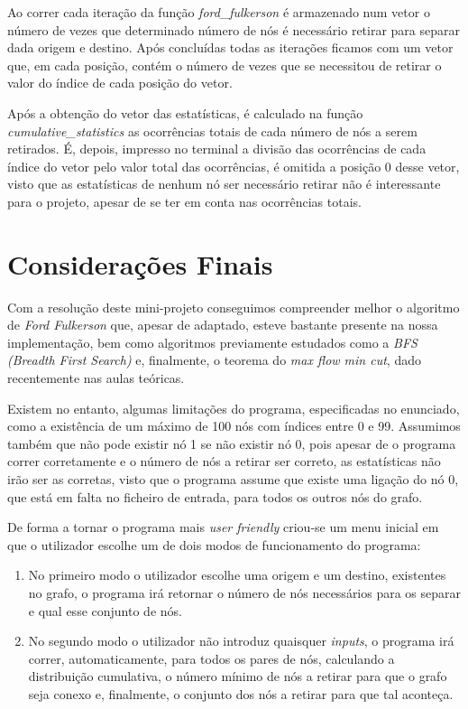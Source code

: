 \documentclass[a4paper]{article}
\begin{document}
Ao correr cada iteração da função \textit{ford\_fulkerson} é armazenado num vetor o número de vezes que determinado número de nós é necessário retirar para separar dada origem e destino. Após concluídas todas as iterações ficamos com um vetor que, em cada posição, contém o número de vezes que se necessitou de retirar o valor do índice de cada posição do vetor. %

Após a obtenção do vetor das estatísticas, é calculado na função \textit{cumulative\_statistics} as ocorrências totais de cada número de nós a serem retirados. É, depois, impresso no terminal a divisão das ocorrências de cada índice do vetor pelo valor total das ocorrências, é omitida a posição 0 desse vetor, visto que as estatísticas de nenhum nó ser necessário retirar não é interessante para o projeto, apesar de se ter em conta nas ocorrências totais.

\section{Considerações Finais}
Com a resolução deste mini-projeto conseguimos compreender melhor o algoritmo de \textit{Ford Fulkerson} que, apesar de adaptado, esteve bastante presente na nossa implementação, bem como algoritmos previamente estudados como a \textit{BFS (Breadth First Search)} e, finalmente, o teorema do \textit{max flow min cut}, dado recentemente nas aulas teóricas.

Existem no entanto, algumas limitações do programa, especificadas no enunciado, como a existência de um máximo de 100 nós com índices entre 0 e 99. Assumimos também que não pode existir nó 1 se não existir nó 0, pois apesar de o programa correr corretamente e o número de nós a retirar ser correto, as estatísticas não irão ser as corretas, visto que o programa assume que existe uma ligação do nó 0, que está em falta no ficheiro de entrada, para todos os outros nós do grafo.

De forma a tornar o programa mais \textit{user friendly} criou-se um menu inicial em que o utilizador escolhe um de dois modos de funcionamento do programa:

\begin{enumerate}
	\item No primeiro modo o utilizador escolhe uma origem e um destino, existentes no grafo, o programa irá retornar o número de nós necessários para os separar e qual esse conjunto de nós.
	\item No segundo modo o utilizador não introduz quaisquer \textit{inputs}, o programa irá correr, automaticamente, para todos os pares de nós, calculando a distribuição cumulativa, o número mínimo de nós a retirar para que o grafo seja conexo e, finalmente, o conjunto dos nós a retirar para que tal aconteça.
\end{enumerate}
\end{document}
